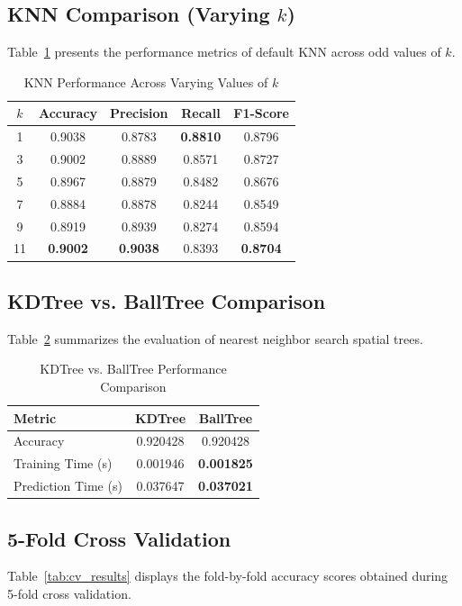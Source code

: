 \documentclass[12pt,a4paper]{article}
\begin{document}
\subsection{KNN Comparison (Varying $k$)}
Table~\ref{tab:knn_varying_k} presents the performance metrics of default KNN across odd values of $k$.

\begin{table}[H]
\centering
\caption{KNN Performance Across Varying Values of $k$} \label{tab:knn_varying_k}
\vspace{0.2cm}
\begin{tabular}{ccccc}
\toprule
\textbf{$k$} & \textbf{Accuracy} & \textbf{Precision} & \textbf{Recall} & \textbf{F1-Score} \\
\midrule
1 & 0.9038 & 0.8783 & \textbf{0.8810} & 0.8796 \\
3 & 0.9002 & 0.8889 & 0.8571 & 0.8727 \\
5 & 0.8967 & 0.8879 & 0.8482 & 0.8676 \\
7 & 0.8884 & 0.8878 & 0.8244 & 0.8549 \\
9 & 0.8919 & 0.8939 & 0.8274 & 0.8594 \\
11 & \textbf{0.9002} & \textbf{0.9038} & 0.8393 & \textbf{0.8704} \\
\bottomrule
\end{tabular}
\end{table}

\subsection{KDTree vs. BallTree Comparison}
Table~\ref{tab:kdtree_balltree} summarizes the evaluation of nearest neighbor search spatial trees.

\begin{table}[H]
\centering
\caption{KDTree vs. BallTree Performance Comparison} \label{tab:kdtree_balltree}
\vspace{0.2cm}
\begin{tabular}{lcc}
\toprule
\textbf{Metric} & \textbf{KDTree} & \textbf{BallTree} \\
\midrule
Accuracy & 0.920428 & 0.920428 \\
Training Time (s) & 0.001946 & \textbf{0.001825} \\
Prediction Time (s) & 0.037647 & \textbf{0.037021} \\
\bottomrule
\end{tabular}
\end{table}

\subsection{5-Fold Cross Validation}
Table~\ref{tab:cv_results} displays the fold-by-fold accuracy scores obtained during 5-fold cross validation.
\end{document}
